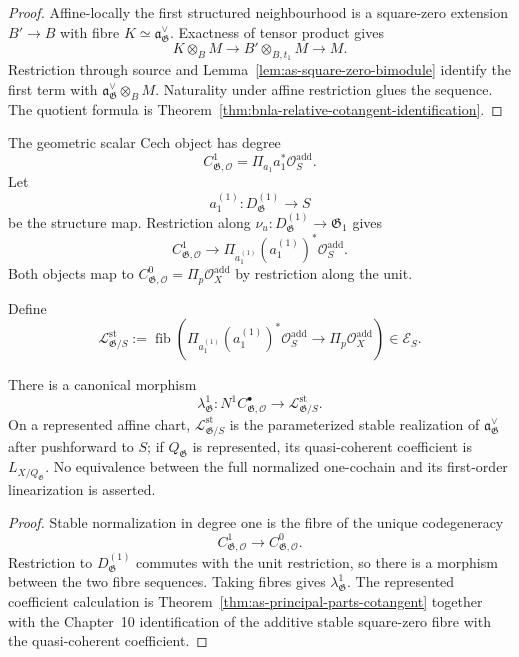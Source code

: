 \begin{proof}
Affine-locally the first structured neighbourhood is a square-zero extension
$B'\to B$ with fibre
$K\simeq\mathfrak a_{\mathfrak G}^{\vee}$.  Exactness of tensor product gives
\[
    K\otimes_BM
    \longrightarrow
    B'\otimes_{B,t_1}M
    \longrightarrow
    M.
\]
Restriction through source and
Lemma~\ref{lem:as-square-zero-bimodule} identify the first term with
$\mathfrak a_{\mathfrak G}^{\vee}\otimes_BM$.  Naturality under affine
restriction glues the sequence.  The quotient formula is
Theorem~\ref{thm:bnla-relative-cotangent-identification}.
\end{proof}

The geometric scalar Cech object has degree
\[
    C_{\mathfrak G,\mathcal O}^1
    =
    \Pi_{a_1}a_1^*\mathcal O_S^{\mathrm{add}}.
\]
Let
\[
    a_1^{(1)}:
    D^{(1)}_{\mathfrak G}\longrightarrow S
\]
be the structure map.  Restriction along
$\nu_u:D^{(1)}_{\mathfrak G}\to\mathfrak G_1$ gives
\[
    C_{\mathfrak G,\mathcal O}^1
    \longrightarrow
    \Pi_{a_1^{(1)}}(a_1^{(1)})^*
    \mathcal O_S^{\mathrm{add}}.
\]
Both objects map to
$C_{\mathfrak G,\mathcal O}^0=\Pi_p\mathcal O_X^{\mathrm{add}}$
by restriction along the unit.

\begin{definition}
\label{def:as-stabilized-first-scalar}
Define
\[
\boxed{
    \mathcal L^{\mathrm{st}}_{\mathfrak G/S}
    :=
    \operatorname{fib}
    \left(
        \Pi_{a_1^{(1)}}(a_1^{(1)})^*
        \mathcal O_S^{\mathrm{add}}
        \longrightarrow
        \Pi_p\mathcal O_X^{\mathrm{add}}
    \right)
    \in\mathcal E_S.
}
\]
\end{definition}

\begin{theorem}
\label{cor:as-scalar-first-order-linearization}
There is a canonical morphism
\[
\boxed{
    \lambda^1_{\mathfrak G}:
    N^1C_{\mathfrak G,\mathcal O}^{\bullet}
    \longrightarrow
    \mathcal L^{\mathrm{st}}_{\mathfrak G/S}.
}
\]
On a represented affine chart,
$\mathcal L^{\mathrm{st}}_{\mathfrak G/S}$ is the parameterized stable
realization of
$\mathfrak a_{\mathfrak G}^{\vee}$ after pushforward to $S$; if
$Q_{\mathfrak G}$ is represented, its quasi-coherent coefficient is
$L_{X/Q_{\mathfrak G}}$.  No equivalence between the full normalized
one-cochain and its first-order linearization is asserted.
\end{theorem}

\begin{proof}
Stable normalization in degree one is the fibre of the unique
codegeneracy
\[
    C_{\mathfrak G,\mathcal O}^1
    \longrightarrow
    C_{\mathfrak G,\mathcal O}^0.
\]
Restriction to $D^{(1)}_{\mathfrak G}$ commutes with the unit restriction, so
there is a morphism between the two fibre sequences.  Taking fibres gives
$\lambda^1_{\mathfrak G}$.  The represented coefficient calculation is
Theorem~\ref{thm:as-principal-parts-cotangent} together with the Chapter~10
identification of the additive stable square-zero fibre with the
quasi-coherent coefficient.
\end{proof}


